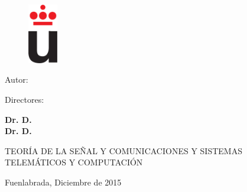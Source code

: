 
\begin{center}

\thispagestyle{empty} %
\begin{figure}[h]
\centering
	\includegraphics[width=1.3cm]{images/logo_URJC.eps} \label{figure:HS2ant}
	\vspace{-0.5cm}
\end{figure}



{\large \universidad} %





\vfill {\LARGE\bf \nombreDoc }\vspace{0.5cm}

{\Large\bf \textsc \tituloDoc }

\vspace{2cm}

{\large Autor:}

{\large\bf \autorDoc}\vspace{1cm}


Directores:

{\large\bf Dr. D. \directorDocA}
\\ {\large\bf Dr. D. \directorDocB}


\vspace{1cm}


\vspace*{1cm} {TEORÍA DE LA SEÑAL Y COMUNICACIONES Y SISTEMAS TELEMÁTICOS Y COMPUTACIÓN}\vspace{1cm}

\large{Fuenlabrada, Diciembre de 2015}
\end{center}
\vspace{2cm}
\clearpage

